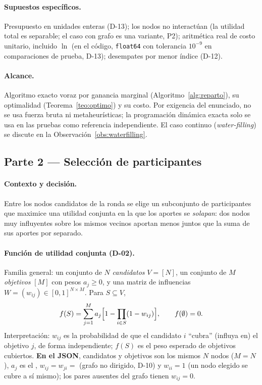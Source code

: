 \paragraph{Supuestos específicos.} Presupuesto en unidades enteras (D-13); los nodos no interactúan (la utilidad total es separable; el caso con grafo es una variante, P2); aritmética real de costo unitario, incluido $\ln$ (en el código, \texttt{float64} con tolerancia $10^{-9}$ en comparaciones de prueba, D-13); desempates por menor índice (D-12).

\paragraph{Alcance.} Algoritmo exacto voraz por ganancia marginal (Algoritmo~\ref{alg:reparto}), su optimalidad (Teorema~\ref{teo:optimo}) y su costo. Por exigencia del enunciado, no se usa fuerza bruta ni metaheurísticas; la programación dinámica exacta solo se usa en las pruebas como referencia independiente. El caso continuo (\emph{water-filling}) se discute en la Observación~\ref{obs:waterfilling}.

\subsection{Parte 2 — Selección de participantes}\label{sec:p2}

\paragraph{Contexto y decisión.} Entre los nodos candidatos de la ronda se elige un subconjunto de participantes que maximice una utilidad conjunta en la que los aportes se \emph{solapan}: dos nodos muy influyentes sobre los mismos vecinos aportan menos juntos que la suma de sus aportes por separado.

\paragraph{Función de utilidad conjunta (D-02).} Familia general: un conjunto de $N$ \emph{candidatos} $V=[N]$, un conjunto de $M$ \emph{objetivos} $[M]$ con pesos $a_j\ge 0$, y una matriz de influencias $W=(w_{ij})\in[0,1]^{N\times M}$. Para $S\subseteq V$,
\[
f(S)=\sum_{j=1}^{M}a_j\Bigl[1-\prod_{i\in S}(1-w_{ij})\Bigr],\qquad f(\emptyset)=0 .
\]
Interpretación: $w_{ij}$ es la probabilidad de que el candidato $i$ ``cubra'' (influya en) el objetivo $j$, de forma independiente; $f(S)$ es el peso esperado de objetivos cubiertos. \textbf{En el JSON}, candidatos y objetivos son los mismos $N$ nodos ($M=N$), $a_j$ es el , $w_{ij}=w_{ji}=$  (grafo no dirigido, D-10) y $w_{ii}=1$ (un nodo elegido se cubre a sí mismo); los pares ausentes del grafo tienen $w_{ij}=0$.

